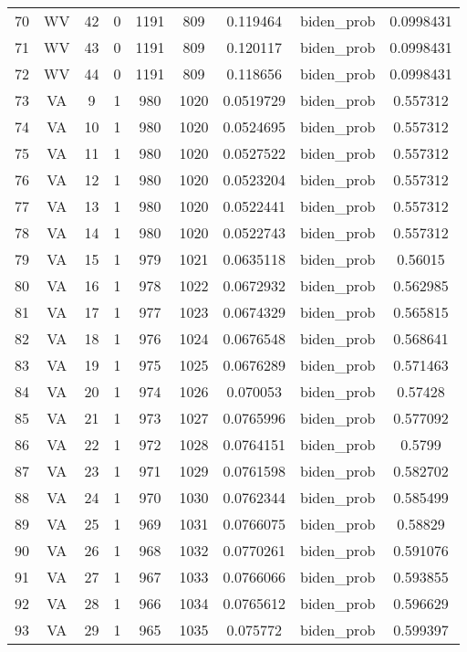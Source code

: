 \documentclass[12pt,a4paper]{article}
\begin{document}
\begin{tabular}{r|cccccccc}
	70 & WV & 42 & 0 & 1191 & 809 & 0.119464 & biden\_prob & 0.0998431 \\
	71 & WV & 43 & 0 & 1191 & 809 & 0.120117 & biden\_prob & 0.0998431 \\
	72 & WV & 44 & 0 & 1191 & 809 & 0.118656 & biden\_prob & 0.0998431 \\
	73 & VA & 9 & 1 & 980 & 1020 & 0.0519729 & biden\_prob & 0.557312 \\
	74 & VA & 10 & 1 & 980 & 1020 & 0.0524695 & biden\_prob & 0.557312 \\
	75 & VA & 11 & 1 & 980 & 1020 & 0.0527522 & biden\_prob & 0.557312 \\
	76 & VA & 12 & 1 & 980 & 1020 & 0.0523204 & biden\_prob & 0.557312 \\
	77 & VA & 13 & 1 & 980 & 1020 & 0.0522441 & biden\_prob & 0.557312 \\
	78 & VA & 14 & 1 & 980 & 1020 & 0.0522743 & biden\_prob & 0.557312 \\
	79 & VA & 15 & 1 & 979 & 1021 & 0.0635118 & biden\_prob & 0.56015 \\
	80 & VA & 16 & 1 & 978 & 1022 & 0.0672932 & biden\_prob & 0.562985 \\
	81 & VA & 17 & 1 & 977 & 1023 & 0.0674329 & biden\_prob & 0.565815 \\
	82 & VA & 18 & 1 & 976 & 1024 & 0.0676548 & biden\_prob & 0.568641 \\
	83 & VA & 19 & 1 & 975 & 1025 & 0.0676289 & biden\_prob & 0.571463 \\
	84 & VA & 20 & 1 & 974 & 1026 & 0.070053 & biden\_prob & 0.57428 \\
	85 & VA & 21 & 1 & 973 & 1027 & 0.0765996 & biden\_prob & 0.577092 \\
	86 & VA & 22 & 1 & 972 & 1028 & 0.0764151 & biden\_prob & 0.5799 \\
	87 & VA & 23 & 1 & 971 & 1029 & 0.0761598 & biden\_prob & 0.582702 \\
	88 & VA & 24 & 1 & 970 & 1030 & 0.0762344 & biden\_prob & 0.585499 \\
	89 & VA & 25 & 1 & 969 & 1031 & 0.0766075 & biden\_prob & 0.58829 \\
	90 & VA & 26 & 1 & 968 & 1032 & 0.0770261 & biden\_prob & 0.591076 \\
	91 & VA & 27 & 1 & 967 & 1033 & 0.0766066 & biden\_prob & 0.593855 \\
	92 & VA & 28 & 1 & 966 & 1034 & 0.0765612 & biden\_prob & 0.596629 \\
	93 & VA & 29 & 1 & 965 & 1035 & 0.075772 & biden\_prob & 0.599397 \\

\end{tabular}
\end{document}
